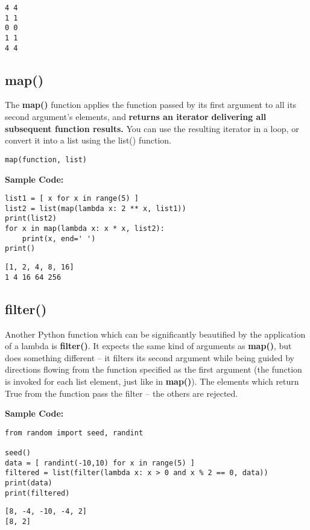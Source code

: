 \documentclass[11pt]{article}
\begin{document}
\begin{verbatim}
4 4
1 1
0 0
1 1
4 4
\end{verbatim}
\subsection{map()}
\label{sec:org4e5d9fa}
The \textbf{map()} function applies the function passed by its first argument
to all its second argument’s elements, and \textbf{returns an iterator}
\textbf{delivering all subsequent function results.} You can use the resulting
iterator in a loop, or convert it into a list using the list()
function.

\texttt{map(function, list)}

\textbf{Sample Code:}

\begin{verbatim}
list1 = [ x for x in range(5) ]
list2 = list(map(lambda x: 2 ** x, list1))
print(list2)
for x in map(lambda x: x * x, list2):
	print(x, end=' ')
print()
\end{verbatim}

\begin{verbatim}
[1, 2, 4, 8, 16]
1 4 16 64 256 
\end{verbatim}
\subsection{filter()}
\label{sec:org15b85a6}
Another Python function which can be significantly beautified by the
application of a lambda is \textbf{filter()}. It expects the same kind of
arguments as \textbf{map()}, but does something different – it filters its
second argument while being guided by directions flowing from the
function specified as the first argument (the function is invoked for
each list element, just like in \textbf{map()}).  The elements which return
True from the function pass the filter – the others are rejected.

\textbf{Sample Code:}

\begin{verbatim}
from random import seed, randint

seed()
data = [ randint(-10,10) for x in range(5) ]
filtered = list(filter(lambda x: x > 0 and x % 2 == 0, data))
print(data)
print(filtered)
\end{verbatim}

\begin{verbatim}
[8, -4, -10, -4, 2]
[8, 2]
\end{verbatim}
\vspace{10 mm}
\end{document}
